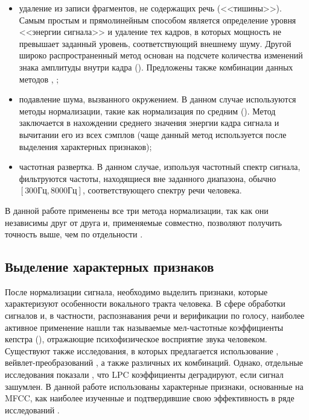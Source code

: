 \begin{itemize}
\item удаление из записи фрагментов, не содержащих речь (<<тишины>>). Самым простым и прямолинейным способом является определение уровня <<энергии сигнала>> и удаление тех кадров, в которых мощность не превышает заданный уровень, соответствующий внешнему шуму. Другой широко распространенный метод основан на подсчете количества изменений знака амплитуды внутри кадра (). Предложены также комбинации данных методов \cite{Greenwood00suv}, \cite{Bachu04zcr};
\item подавление шума, вызванного окружением. В данном случае используются методы нормализации, такие как нормализация по средним (). Метод заключается в нахождении среднего значения энергии кадра сигнала и вычитании его из всех сэмплов (чаще данный метод используется после выделения характерных признаков);
\item частотная развертка. В данном случае, изпользуя частотный спектр сигнала, фильтруются частоты, находящиеся вне заданного диапазона, обычно $[300\textrm{Гц}, 8000\textrm{Гц}]$, соответствующего спектру речи человека.
\end{itemize}

В данной работе применены все три метода нормализации, так как они независимы друг от друга и, применяемые совместно, позволяют получить точность выше, чем по отдельности \cite{Jayanna09overview}.

\subsection{Выделение характерных признаков}
\label{sec:analytic:features}

После нормализации сигнала, необходимо выделить признаки, которые характеризуют особенности вокального тракта человека. В сфере обработки сигналов и, в частности, распознавания речи и верификации по голосу, наиболее активное применение нашли так называемые мел-частотные коэффициенты кепстра (), отражающие психофизическое восприятие звука человеком. Существуют также исследования, в которых предлагается использование , вейвлет-преобразований \cite{Medvedev06wavelets}, а также различных их комбинаций. Однако, отдельные исследования показали \cite{Tierney80LPC}, что LPC коэффициенты деградируют, если сигнал зашумлен. В данной работе использованы характерные признаки, основанные на MFCC, как наиболее изученные и подтвердившие свою эффективность в ряде исследований \cite{Jayanna09overview}.

